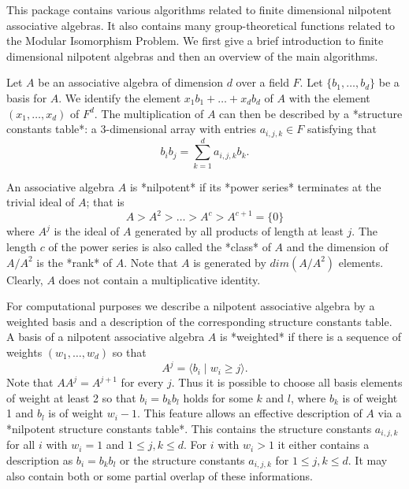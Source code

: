 

This package contains various algorithms related to finite dimensional 
nilpotent associative algebras. It also contains many group-theoretical
functions related to the Modular Isomorphism Problem.
We first give a brief introduction to finite dimensional
nilpotent algebras and then an overview of the main algorithms.


Let $A$ be an associative algebra of dimension $d$ over a field $F$.
Let $\{b_1, \ldots, b_d\}$ be a basis for $A$. We identify the 
element $x_1 b_1 + \ldots + x_d b_d$ of $A$ with the element 
$(x_1, \ldots, x_d)$ of $F^d$. The multiplication of $A$ can then 
be described by a *structure constants table*: a 3-dimensional array 
with entries $a_{i,j,k} \in F$ satisfying that
$$b_i b_j = \sum_{k=1}^d a_{i,j,k} b_k.$$
\medskip

An associative algebra $A$ is *nilpotent* if its *power series* terminates
at the trivial ideal of $A$; that is
$$
A > A^2 > \ldots > A^c > A^{c+1} = \{0\} $$
where $A^j$ is the ideal of $A$ generated by all products of length 
at least $j$. The length $c$ of the power series is also called the 
*class* of $A$ and the dimension of $A/A^2$ is the *rank* of $A$. Note
that $A$ is generated by $dim(A/A^2)$ elements. Clearly, $A$ does not 
contain a multiplicative identity. 
\medskip

For computational purposes we describe a nilpotent associative algebra by 
a weighted basis and a description of the corresponding structure constants 
table. A basis of a nilpotent associative algebra $A$ is *weighted* if
there is a sequence of weights $(w_1, \ldots, w_d)$ so that
$$A^j = \langle b_i \mid w_i \geq j \rangle.$$
Note that $A A^j = A^{j+1}$ for every $j$. Thus it is possible to choose
all basis elements of weight at least 2 so that $b_i = b_k b_l$ holds for
some $k$ and $l$, where $b_k$ is of weight 1 and $b_l$ is of weight $w_i-1$. 
This feature allows an effective description of $A$ via a *nilpotent 
structure constants table*. This contains the structure constants 
$a_{i,j,k}$ for all $i$ with $w_i = 1$ and $1 \leq j,k \leq d$. For $i$ 
with $w_i > 1$ it either contains a description as $b_i = b_k b_l$ or the 
structure constants $a_{i,j,k}$ for $1 \leq j,k \leq d$. It may also 
contain both or some partial overlap of these informations.

